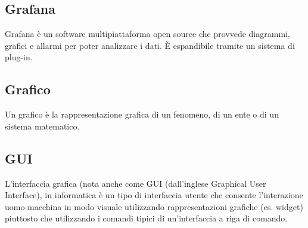 \subsection*{Grafana}
Grafana è un software multipiattaforma open source che provvede diagrammi, grafici e allarmi per poter analizzare i dati. È espandibile tramite un sistema di plug-in.

\subsection*{Grafico}
Un grafico è la rappresentazione grafica di un fenomeno, di un ente o di un sistema matematico.

\subsection*{GUI}
L'interfaccia grafica (nota anche come GUI (dall'inglese Graphical User Interface), in informatica è un tipo di interfaccia utente che consente l'interazione uomo-macchina in modo visuale utilizzando rappresentazioni grafiche (es. widget) piuttosto che utilizzando i comandi tipici di un'interfaccia a riga di comando.

